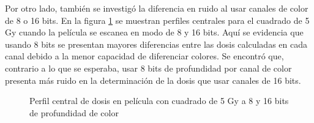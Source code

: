 Por otro lado, también se investigó la diferencia en ruido al usar canales de color de 8 o 16 bits. En la figura  \ref{fig:8o16} se muestran perfiles centrales para el cuadrado de 5 Gy cuando la película se escanea en modo de 8 y 16 bits. Aquí se evidencia que usando 8 bits se presentan mayores diferencias entre las dosis calculadas en cada canal debido a la menor capacidad de diferenciar colores. Se encontró que, contrario a lo que se esperaba, usar 8 bits de profundidad por canal de color presenta más ruido en la determinación de la dosis que usar canales de 16 bits.\\
\begin{figure}[H]
	\centering
	\hfill
	\caption{Perfil central de dosis en película con cuadrado de 5 Gy a 8 y 16 bits de profundidad de color}
	\label{fig:8o16}
\end{figure}

